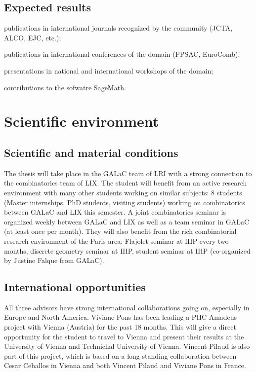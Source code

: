 \documentclass[a4paper,12pt]{article}
\begin{document}
\subsection{Expected results}

\begin{compactitem}
\item publications in international journals recognized by the community (JCTA, ALCO, EJC, etc.);
\item publications in international conferences of the domain (FPSAC, EuroComb);
\item presentations in national and international workshops of the domain;
\item contributions to the sofwatre SageMath.
\end{compactitem}

\section{Scientific environment}

\subsection{Scientific and material conditions}

The thesis will take place in the GALaC team of LRI with a strong connection to the combinatorics team of LIX. The student will benefit from an active research environment with many other students working on similar subjects: 8 students (Master internships, PhD students, visiting students) working on combinatorics between GALaC and LIX this semester. A joint combinatorics seminar is organized weekly between GALaC and LIX as well as a team seminar in GALaC (at least once per month). They will also benefit from the rich combinatorial research environment of the Paris area: Flajolet seminar at IHP every two months, discrete geometry seminar at IHP, student seminar at IHP (co-organized by Justine Falque from GALaC). 

\subsection{International opportunities}

All three advisors have strong international collaborations going on, especially in Europe and North America. Viviane Pons has been leading a PHC Amadeus project with Vienna (Austria) for the past 18 months. This will give a direct opportunity for the student to travel to Vienna and present their results at the University of Vienna and Technichal University of Vienna. Vincent Pilaud is also part of this project, which is based on a long standing collaboration between Cesar Ceballos in Vienna and both Vincent Pilaud and Viviane Pons in France. 
\end{document}
